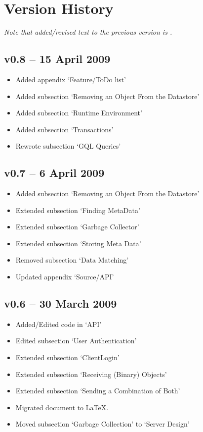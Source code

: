 \section{Version History}
\emph{Note that added/revised text to the previous version is .}

\subsection*{v0.8 -- 15 April 2009}
\begin{itemize}
  \item Added appendix `Feature/ToDo list'
  \item Added subsection `Removing an Object From the Datastore'
  \item Added subsection `Runtime Environment'
  \item Added subsection `Transactions' 
  \item Rewrote subsection `GQL Queries'
\end{itemize}

\subsection*{v0.7 -- 6 April 2009}
\begin{itemize}
  \item Added subsection `Removing an Object From the Datastore'
  \item Extended subsection `Finding MetaData'
  \item Extended subsection `Garbage Collector'
  \item Extended subsection `Storing Meta Data'
  \item Removed subsection `Data Matching'
  \item Updated appendix `Source/API'
\end{itemize}

\subsection*{v0.6 -- 30 March 2009}
\begin{itemize}
  \item Added/Edited code in `API' 
  \item Edited subsection `User Authentication'
  \item Extended subsection `ClientLogin'
  \item Extended subsection `Receiving (Binary) Objects'
  \item Extended subsection `Sending a Combination of Both'
  \item Migrated document to \LaTeX.
  \item Moved subsection `Garbage Collection' to `Server Design'
\end{itemize}

